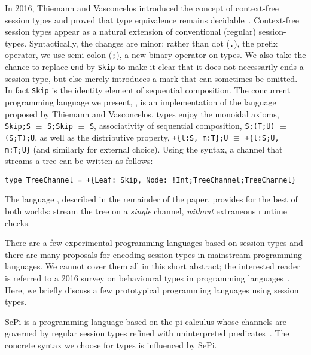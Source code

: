 In 2016, Thiemann and Vasconcelos introduced the concept of
context-free session types and proved that type equivalence remains
decidable~\cite{DBLP:conf/icfp/ThiemannV16}.
%
Context-free session types appear as a natural extension of
conventional (regular) session-types. Syntactically, the changes are
minor: rather than dot (\lstinline|.|), the prefix operator, we use
semi-colon (\lstinline|;|), a new binary operator on types. We also
take the chance to replace \lstinline [morekeywords=end]|end| by
\lstinline|Skip| to make it clear that it does not necessarily ends a
session type, but else merely introduces a mark that can sometimes be
omitted. In fact \lstinline|Skip| is the identity element of
sequential composition. The concurrent programming language we
present, \freest, is an implementation of the language proposed by
Thiemann and Vasconcelos.  \freest{} types enjoy the monoidal axioms,
\lstinline|Skip;S| $\equiv$ \lstinline|S;Skip| $\equiv$ \lstinline|S|,
associativity of sequential composition, \lstinline|S;(T;U)| $\equiv$
\lstinline|(S;T);U|, as well as the distributive property,
%
\lstinline|+{l:S, m:T};U| $\equiv$ \lstinline|+{l:S;U, m:T;U}| (and
similarly for external choice).
%
Using the \freest{} syntax, a channel that streams a tree can be
written as follows:
%
\begin{lstlisting}
type TreeChannel = +{Leaf: Skip, Node: !Int;TreeChannel;TreeChannel}
\end{lstlisting}

The language \freest, described in the remainder of the paper, 
provides for the best
of both worlds: stream the tree on a \emph{single} channel,
\emph{without} extraneous runtime checks.


There are a few experimental programming languages based on session
types and there are many proposals for encoding session types in
mainstream programming languages. We cannot cover them all in
this short abstract; the interested reader is referred to a 2016
survey on behavioural types in programming
languages~\cite{DBLP:journals/ftpl/AnconaBB0CDGGGH16}.  Here, we briefly
discuss a few prototypical programming languages using session types.

SePi is a programming language based on the pi-calculus whose channels
are governed by regular session types refined with uninterpreted
predicates~\cite{DBLP:conf/sefm/FrancoV13}. The concrete syntax we
choose for \freest{} types is influenced by SePi.


